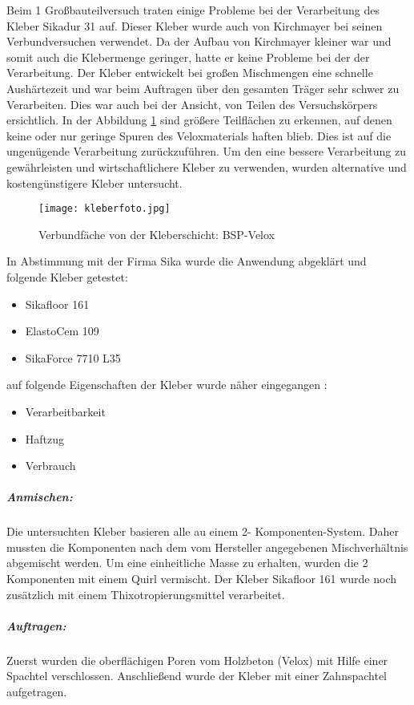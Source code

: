 \documentclass[12 pt,a4 paper ]{scrreprt}
\begin{document}
Beim 1 Großbauteilversuch traten einige Probleme bei der Verarbeitung des Kleber Sikadur 31 auf. Dieser Kleber wurde auch von Kirchmayer bei seinen Verbundversuchen verwendet. Da der Aufbau von Kirchmayer kleiner war und somit auch die Klebermenge geringer, hatte er keine Probleme bei der der Verarbeitung. Der Kleber entwickelt bei großen Mischmengen eine schnelle Aushärtezeit und war beim Auftragen über den gesamten Träger sehr schwer zu Verarbeiten. Dies war auch bei der Ansicht, von Teilen des Versuchskörpers ersichtlich. In der Abbildung \ref{kleberfoto} sind größere Teilflächen zu erkennen, auf denen keine oder nur geringe Spuren des Veloxmaterials haften blieb. Dies ist auf die ungenügende Verarbeitung zurückzuführen. Um den eine bessere Verarbeitung zu gewährleisten und wirtschaftlichere Kleber zu verwenden, wurden alternative und kostengünstigere Kleber untersucht. 
\begin{figure}[h]
\begin{center}
\texttt{[image: kleberfoto.jpg]}
\caption{ Verbundfäche von der Kleberschicht: BSP-Velox}
\label{kleberfoto}
\end{center}
\end{figure}



In Abstimmung mit der Firma Sika wurde die Anwendung abgeklärt und folgende Kleber getestet:
\begin{itemize}
\item Sikafloor 161
\item ElastoCem 109
\item SikaForce 7710 L35
\end{itemize}


auf folgende Eigenschaften der Kleber wurde näher eingegangen :	

\begin{itemize}
\item Verarbeitbarkeit
\item Haftzug
\item Verbrauch
\end{itemize}


\subparagraph{Anmischen:}
Die untersuchten Kleber basieren alle au einem 2- Komponenten-System. Daher mussten die Komponenten nach dem vom Hersteller  angegebenen Mischverhältnis abgemischt werden. Um eine einheitliche Masse zu erhalten, wurden die 2 Komponenten mit einem Quirl vermischt. Der Kleber Sikafloor 161 wurde noch zusätzlich mit einem Thixotropierungsmittel verarbeitet.

\subparagraph{Auftragen:}
Zuerst wurden die oberflächigen Poren vom Holzbeton (Velox) mit Hilfe einer Spachtel verschlossen. Anschließend wurde der Kleber mit einer Zahnspachtel aufgetragen.
\end{document}
